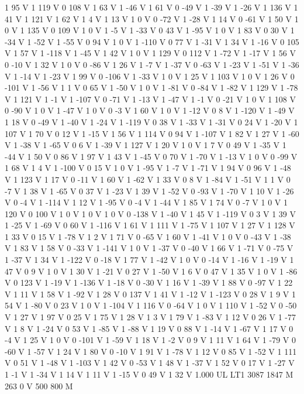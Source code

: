 {{1 95 V
1 119 V
0 108 V
1 63 V
1 -46 V
1 61 V
0 -49 V
1 -39 V
1 -26 V
1 136 V
1 41 V
1 121 V
1 62 V
1 4 V
1 13 V
1 0 V
0 -72 V
1 -28 V
1 14 V
0 -61 V
1 50 V
1 0 V
1 135 V
0 109 V
1 0 V
1 -5 V
1 -33 V
0 43 V
1 -95 V
1 0 V
1 83 V
0 30 V
1 -34 V
1 -52 V
1 -55 V
0 94 V
1 0 V
1 -110 V
0 77 V
1 -31 V
1 34 V
1 -16 V
0 105 V
1 57 V
1 -118 V
1 -45 V
1 42 V
1 0 V
1 129 V
0 112 V
1 -72 V
1 -17 V
1 56 V
0 -10 V
1 32 V
1 0 V
0 -86 V
1 26 V
1 -7 V
1 -37 V
0 -63 V
1 -23 V
1 -51 V
1 -36 V
1 -14 V
1 -23 V
1 99 V
0 -106 V
1 -33 V
1 0 V
1 25 V
1 103 V
1 0 V
1 26 V
0 -101 V
1 -56 V
1 1 V
0 65 V
1 -50 V
1 0 V
1 -81 V
0 -84 V
1 -82 V
1 129 V
1 -78 V
1 121 V
1 -1 V
1 -107 V
0 -71 V
1 -13 V
1 -47 V
1 -1 V
0 -21 V
1 0 V
1 108 V
0 -90 V
1 0 V
1 -47 V
1 0 V
0 -3 V
1 60 V
1 0 V
1 -12 V
0 8 V
1 -120 V
1 -49 V
1 18 V
0 -49 V
1 -40 V
1 -24 V
1 -119 V
0 38 V
1 -33 V
1 -31 V
0 24 V
1 -20 V
1 107 V
1 70 V
0 12 V
1 -15 V
1 56 V
1 114 V
0 94 V
1 -107 V
1 82 V
1 27 V
1 -60 V
1 -38 V
1 -65 V
0 6 V
1 -39 V
1 127 V
1 20 V
1 0 V
1 7 V
0 49 V
1 -35 V
1 -44 V
1 50 V
0 86 V
1 97 V
1 43 V
1 -45 V
0 70 V
1 -70 V
1 -13 V
1 0 V
0 -99 V
1 68 V
1 4 V
1 -100 V
0 15 V
1 0 V
1 -95 V
1 -7 V
1 -71 V
1 94 V
0 96 V
1 -48 V
1 123 V
1 17 V
0 -11 V
1 60 V
1 -62 V
1 33 V
0 8 V
1 -84 V
1 -51 V
1 1 V
0 -7 V
1 38 V
1 -65 V
0 37 V
1 -23 V
1 39 V
1 -52 V
0 -93 V
1 -70 V
1 10 V
1 -26 V
0 -4 V
1 -114 V
1 12 V
1 -95 V
0 -4 V
1 -44 V
1 85 V
1 74 V
0 -7 V
1 0 V
1 120 V
0 100 V
1 0 V
1 0 V
1 0 V
0 -138 V
1 -40 V
1 45 V
1 -119 V
0 3 V
1 39 V
1 -25 V
1 -69 V
0 60 V
1 -116 V
1 61 V
1 111 V
1 -75 V
1 107 V
1 27 V
1 128 V
1 33 V
0 15 V
1 -78 V
1 2 V
1 71 V
0 -65 V
1 60 V
1 -41 V
1 0 V
0 -43 V
1 -38 V
1 83 V
1 58 V
0 -33 V
1 -141 V
1 0 V
1 -37 V
0 -40 V
1 66 V
1 -71 V
0 -75 V
1 -37 V
1 34 V
1 -122 V
0 -18 V
1 77 V
1 -42 V
1 0 V
0 -14 V
1 -16 V
1 -19 V
1 47 V
0 9 V
1 0 V
1 30 V
1 -21 V
0 27 V
1 -50 V
1 6 V
0 47 V
1 35 V
1 0 V
1 -86 V
0 123 V
1 -19 V
1 -136 V
1 -18 V
0 -30 V
1 16 V
1 -39 V
1 88 V
0 -97 V
1 22 V
1 11 V
1 58 V
1 -92 V
1 28 V
0 137 V
1 41 V
1 -12 V
1 -123 V
0 28 V
1 9 V
1 54 V
1 -80 V
0 23 V
1 0 V
1 -104 V
1 116 V
0 -64 V
1 0 V
1 110 V
1 -52 V
0 -50 V
1 27 V
1 97 V
0 25 V
1 75 V
1 28 V
1 3 V
1 79 V
1 -83 V
1 12 V
0 26 V
1 -77 V
1 8 V
1 -24 V
0 53 V
1 -85 V
1 -88 V
1 19 V
0 88 V
1 -14 V
1 -67 V
1 17 V
0 -4 V
1 25 V
1 0 V
0 -101 V
1 -59 V
1 18 V
1 -2 V
0 9 V
1 11 V
1 64 V
1 -79 V
0 -60 V
1 -57 V
1 24 V
1 80 V
0 -10 V
1 91 V
1 -78 V
1 12 V
0 85 V
1 -52 V
1 111 V
0 51 V
1 -48 V
1 -103 V
1 42 V
0 -53 V
1 48 V
1 -37 V
1 52 V
0 17 V
1 -27 V
1 -1 V
1 -34 V
1 14 V
1 11 V
1 -15 V
0 49 V
1 32 V
1.000 UL
LT1
3087 1847 M
263 0 V
500 800 M
}}
